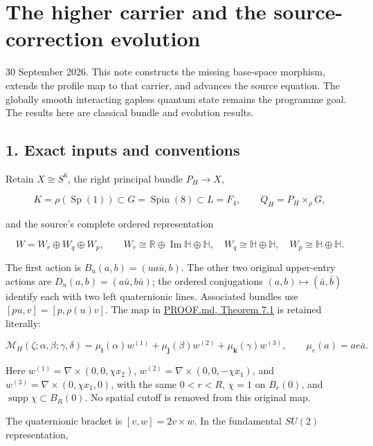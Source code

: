 \documentclass[11pt]{article}
\begin{document}
\section*{The higher carrier and the source-correction evolution}

30 September 2026. This note constructs the missing base-space morphism,
extends the profile map to that carrier, and advances the source equation.
The globally smooth interacting gapless quantum state remains the programme
goal. The results here are classical bundle and evolution results.

\subsection*{1. Exact inputs and conventions}

Retain \(X\cong S^6\), the right principal bundle \(P_H\to X\),

\[
 K=\rho(\operatorname{Sp}(1))\subset G=\operatorname{Spin}(8)
 \subset L=F_4,
 \qquad Q_H=P_H\times_\rho G,
\]

and the source's complete ordered representation

\[
 W=W_r\oplus W_q\oplus W_p,
 \qquad W_r\cong\mathbb R\oplus\operatorname{Im}\mathbb H\oplus\mathbb H,
 \quad W_q\cong\mathbb H\oplus\mathbb H,
 \quad W_p\cong\mathbb H\oplus\mathbb H.
\]

The first action is \(B_u(a,b)=(ua\bar u,b)\). The other two original
upper-entry actions are \(D_u(a,b)=(a\bar u,b\bar u)\); the ordered
conjugations \((a,b)\mapsto(\bar a,\bar b)\) identify each with two
left quaternionic lines. Associated bundles use \([pu,v]=[p,\rho(u)v]\).
The map in \href{https://github.com/KokunoYumeto/yang-mills-interacting-workbench/blob/main/yang-mills/continuations/20260930-s6-ns-moment-map-bridge/PROOF.md}{PROOF.md, Theorem 7.1} is retained literally:

\[
 \mathcal M_H(\zeta;\alpha,\beta;\gamma,\delta)
 =\mu_{\mathbf i}(\alpha)w^{(1)}
  +\mu_{\mathbf j}(\beta)w^{(2)}
  +\mu_{\mathbf k}(\gamma)w^{(3)},\qquad
 \mu_e(a)=ae\bar a.
 \tag{HC1}
\]

Here \(w^{(1)}=\nabla\times(0,0,\chi x_2)\),
\(w^{(2)}=\nabla\times(0,0,-\chi x_1)\), and
\(w^{(3)}=\nabla\times(0,\chi x_1,0)\), with the same
\(0<r<R\), \(\chi=1\) on \(B_r(0)\), and
\(\operatorname{supp}\chi\subset B_R(0)\). No spatial cutoff is removed
from this original map.

The quaternionic bracket is \([v,w]=2v\times w\). In the fundamental
\(SU(2)\) representation,
\end{document}

